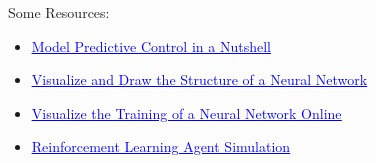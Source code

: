 \documentclass[aspectratio=169,hyperref={pdfpagelabels=false}]{beamer}
\begin{document}
          \begin{frame}{Some Resources: }
            \begin{itemize}
              \item \href{https://www.youtube.com/watch?v=0Ey02HT_1Ho&ab_channel=SteveBrunton}{\textcolor{blue}{\underline{Model Predictive Control in a Nutshell}}}
              \item \href{https://alexlenail.me/NN-SVG/}{\textcolor{blue}{\underline{Visualize and Draw the Structure of a Neural Network}}}
              \item \href{https://playground.tensorflow.org}{\textcolor{blue}{\underline{Visualize the Training of a Neural Network Online}}}
              \item \href{https://www.youtube.com/watch?v=L_4BPjLBF4E&ab_channel=AIWarehouse}{\textcolor{blue}{\underline{Reinforcement Learning Agent Simulation}}}
            \end{itemize}
          \end{frame}
\end{document}
